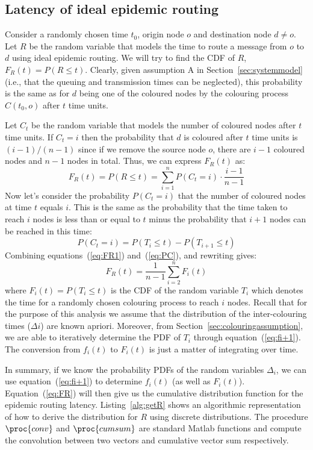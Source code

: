 \documentclass{article}
\begin{document}
\subsection{Latency of ideal epidemic routing}

Consider a randomly chosen time $t_0$, origin node $o$ and destination
node $d \neq o$. Let $R$ be the random variable that models the time
to route a message from $o$ to $d$ using ideal epidemic routing. We
will try to find the CDF of $R$, $F_R(t) = P(R \le t)$. Clearly, given
assumption A in Section~\ref{sec:systemmodel} (i.e., that the queuing and transmission times can be
neglected), this probability is the same as for $d$ being one of the
coloured nodes by the colouring process $C(t_0,o)$ after $t$ time
units.

Let $C_t$ be the random variable that models the number of coloured
nodes after $t$ time units. If $C_t = i$ then the probability that $d$
is coloured after $t$ time units is $(i-1)/(n-1)$ since if we remove
the source node $o$, there are $i-1$ coloured nodes and $n-1$ nodes in
total. Thus, we can express $F_R(t)$ as:
\begin{equation}
\label{eq:FR1}
F_R(t) = P(R \le t)= \sum_{i=1}^n P(C_t = i ) \cdot \frac{i-1}{n-1}
\end{equation}
Now let's consider the probability $P(C_t = i)$ that the number of
coloured nodes at time $t$ equals $i$. This is the same as the
probability that the time taken to reach $i$ nodes is less than or
equal to $t$ minus the probability that $i+1$ nodes can be reached in this time:
\begin{equation}
\label{eq:PC}
P(C_t = i) = P(T_i \le t) - P(T_{i+1} \le t)
\end{equation}
Combining equations~(\ref{eq:FR1}) and~(\ref{eq:PC}), and rewriting gives:
\begin{equation}
\label{eq:FR}
F_R(t) = \frac{1}{n-1} \sum_{i=2}^n F_i(t)
\end{equation}
where $F_i(t) = P(T_i \le t)$ is the CDF of the random variable $T_i$
which denotes the time for a randomly chosen colouring process to
reach $i$ nodes.  Recall that for the purpose of this analysis we
assume that the distribution of the inter-colouring times ($\Delta i$)
are known apriori. Moreover, from
Section~\ref{sec:colouringassumption}, we are able to iteratively
determine the PDF of $T_i$ through equation~(\ref{eq:fi+1}). The
conversion from $f_i(t)$ to $F_i(t)$ is just a matter of integrating
over time.

In summary, if we know the probability PDFs of the random variables
$\Delta_i$, we can use equation~(\ref{eq:fi+1}) to determine $f_i(t)$
(as well as $F_i(t)$). Equation~(\ref{eq:FR}) will then give us the
cumulative distribution function for the epidemic routing latency.
Listing~\ref{alg:getR} shows an algorithmic representation of how to
derive the distribution for $R$ using discrete distributions. The
procedure $\proc{conv}$ and $\proc{cumsum}$ are standard Matlab
functions and compute the convolution between two vectors and
cumulative vector sum respectively.
\end{document}
